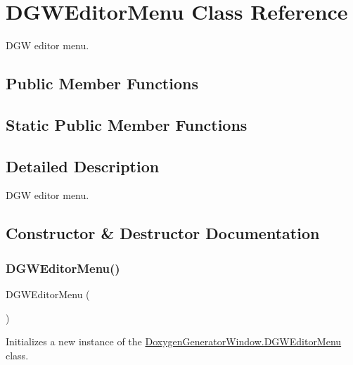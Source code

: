 \hypertarget{classDoxygenGeneratorWindow_1_1DGWEditorMenu}{}\section{D\+G\+W\+Editor\+Menu Class Reference}
\label{classDoxygenGeneratorWindow_1_1DGWEditorMenu}


D\+GW editor menu.  


\subsection*{Public Member Functions}
\subsection*{Static Public Member Functions}


\subsection{Detailed Description}
D\+GW editor menu. 



\subsection{Constructor \& Destructor Documentation}
\mbox{\label{classDoxygenGeneratorWindow_1_1DGWEditorMenu_abc03c777b285ed315fc74db7340b3664}} 
\subsubsection{\texorpdfstring{D\+G\+W\+Editor\+Menu()}{DGWEditorMenu()}}
{\footnotesize\ttfamily D\+G\+W\+Editor\+Menu (\begin{DoxyParamCaption}{ }\end{DoxyParamCaption})}



Initializes a new instance of the \hyperlink{classDoxygenGeneratorWindow_1_1DGWEditorMenu}{Doxygen\+Generator\+Window.\+D\+G\+W\+Editor\+Menu} class. 



